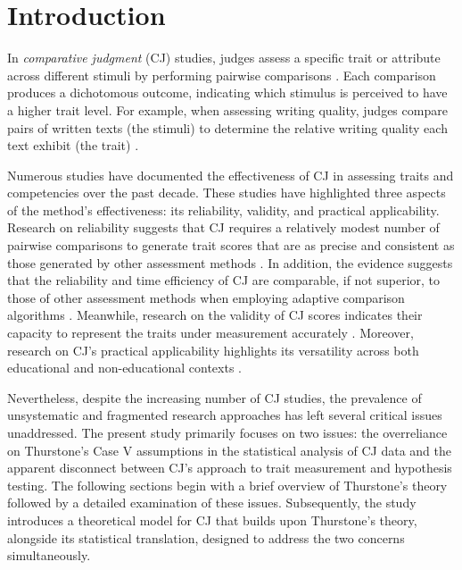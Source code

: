 \documentclass[
  authoryear,
  review,
  1p]{elsarticle}
\begin{document}
\section{Introduction}\label{sec-introduction}

In \emph{comparative judgment} (CJ) studies, judges assess a specific
trait or attribute across different stimuli by performing pairwise
comparisons \citep{Thurstone_1927a, Thurstone_1927b}. Each comparison
produces a dichotomous outcome, indicating which stimulus is perceived
to have a higher trait level. For example, when assessing writing
quality, judges compare pairs of written texts (the stimuli) to
determine the relative writing quality each text exhibit (the trait)
\citep{Laming_2004, Pollitt_2012b, Whitehouse_2012, vanDaal_et_al_2016, Lesterhuis_2018_thesis, Coertjens_et_al_2017, Goossens_et_al_2018, Bouwer_et_al_2023}.

Numerous studies have documented the effectiveness of CJ in assessing
traits and competencies over the past decade. These studies have
highlighted three aspects of the method's effectiveness: its
reliability, validity, and practical applicability. Research on
reliability suggests that CJ requires a relatively modest number of
pairwise comparisons \citep{Verhavert_et_al_2019, Crompvoets_et_al_2022}
to generate trait scores that are as precise and consistent as those
generated by other assessment methods
\citep{Coertjens_et_al_2017, Goossens_et_al_2018, Bouwer_et_al_2023}. In
addition, the evidence suggests that the reliability and time efficiency
of CJ are comparable, if not superior, to those of other assessment
methods when employing adaptive comparison algorithms
\citep{Pollitt_2012b, Verhavert_et_al_2022, Mikhailiuk_et_al_2021}.
Meanwhile, research on the validity of CJ scores indicates their
capacity to represent the traits under measurement accurately
\citep{Whitehouse_2012, vanDaal_et_al_2016, Lesterhuis_2018_thesis, Bartholomew_et_al_2018, Bouwer_et_al_2023}.
Moreover, research on CJ's practical applicability highlights its
versatility across both educational and non-educational contexts
\citep{Kimbell_2012, Jones_et_al_2015, Bartholomew_et_al_2018, Jones_et_al_2019, Marshall_et_al_2020, Bartholomew_et_al_2020, Boonen_et_al_2020}.

Nevertheless, despite the increasing number of CJ studies, the
prevalence of unsystematic and fragmented research approaches has left
several critical issues unaddressed. The present study primarily focuses
on two issues: the overreliance on Thurstone's Case V assumptions in the
statistical analysis of CJ data and the apparent disconnect between CJ's
approach to trait measurement and hypothesis testing. The following
sections begin with a brief overview of Thurstone's theory followed by a
detailed examination of these issues. Subsequently, the study introduces
a theoretical model for CJ that builds upon Thurstone's theory,
alongside its statistical translation, designed to address the two
concerns simultaneously.
\end{document}
